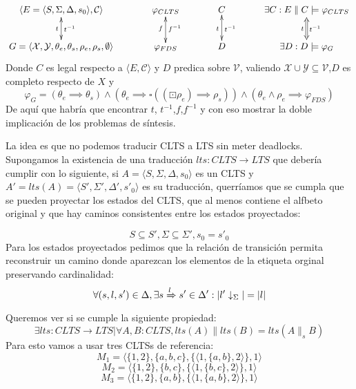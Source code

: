 \[\xymatrix@C+1pc{
	\langle E = \langle S, \Sigma, \Delta, s_0 \rangle, \mathcal{C} \rangle \ar@{<->}[d]^{t^{-1}}_{t}
	& \varphi_{CLTS}\ar@{<->}[d]^{f^{-1}}_{f}
	& C\ar@{<->}[d]^{t^{-1}}_{t}
	& \exists C: E\parallel C \models  \varphi_{CLTS}\ar@{<=>}[d]^{t^{-1}}_{t}\\
	G = \langle \mathcal{X},\mathcal{Y},\theta_e,\theta_s,\rho_e,\rho_s, \emptyset \rangle
	& \varphi_{FDS}
	& D
	&\exists D: D \models \varphi_G\\
}\]
Donde $C$ es legal respecto a $\langle E,\mathcal{C} \rangle$ y $D$ predica sobre $\mathcal{V}$, valiendo $\mathcal{X} \cup \mathcal{Y} \subseteq \mathcal{V}$,$D$ es completo respecto de $X$ y
\[\varphi_G = (\theta_e \implies \theta_s) \wedge (\theta_e \implies \square((\boxdot \rho_e) \implies \rho_s)) \wedge (\theta_e \wedge \rho_e \implies \varphi_{FDS}) \]
De aquí que habría que encontrar $t$, $t^{-1}$,$f$,$f^{-1}$ y con eso mostrar la doble implicación de los problemas de síntesis.
\newpage

La idea es que no podemos traducir CLTS a LTS sin meter deadlocks.
Supongamos la existencia de una traducción $lts:CLTS \rightarrow LTS$ que debería cumplir con lo siguiente, si $A=\langle S, \Sigma, \Delta, s_0 \rangle$ es un CLTS y $A'=lts(A)=\langle S', \Sigma', \Delta', s'_0 \rangle$ es su traducción, querríamos que se cumpla que se pueden proyectar los estados del CLTS, que al menos contiene el alfbeto original y que hay caminos consistentes entre los estados proyectados:

\[S \subseteq S', \Sigma \subseteq \Sigma', s_0 = s'_0\]
Para los estados proyectados pedimos que la relación de transición permita reconstruir un camino donde aparezcan los elementos de la etiqueta orginal preservando cardinalidad:
\[ \forall (s,l,s') \in \Delta, \exists s \xRightarrow[]{l} s' \in \Delta': |l'\downarrow_{\Sigma}| = |l| \]
Queremos ver si se cumple la siguiente propiedad:
\[\exists lts: CLTS \rightarrow LTS | \forall A,B:CLTS, lts(A) \parallel lts(B) = lts(A \parallel_s B)\]
Para esto vamos a usar tres CLTSs de referencia:
\[M_1 = \langle \lbrace 1,2 \rbrace, \lbrace a,b,c \rbrace, \lbrace\langle 1, \lbrace a,b \rbrace, 2 \rangle\rbrace, 1 \rangle\]
\[M_2 = \langle \lbrace 1,2 \rbrace, \lbrace b,c \rbrace, \lbrace \langle 1, \lbrace b,c \rbrace, 2 \rangle\rbrace, 1 \rangle\]
\[M_3 = \langle \lbrace 1,2 \rbrace, \lbrace a,b \rbrace, \lbrace \langle 1, \lbrace a,b \rbrace, 2 \rangle\rbrace, 1 \rangle\]

